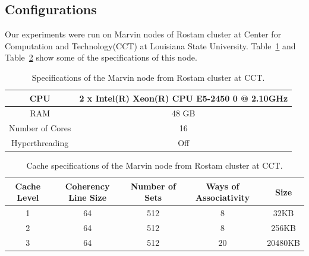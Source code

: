 \subsection{Configurations}
Our experiments were run on Marvin nodes of Rostam cluster at Center for Computation and Technology(CCT) at Louisiana State University. Table~\ref{table3} and Table~\ref{table4} show some of the specifications of this node.

\vspace{\baselineskip}	
\begin{table}[H]
	\centering
	\scalebox{0.75}
	{\begin{tabular}{|c | c |} 
			\hline
			CPU &  2 x Intel(R) Xeon(R) CPU E5-2450 0 @ 2.10GHz \\ [0.5ex] 
			\hline
			RAM & 48 GB\\ 	
			\hline
			Number of Cores & 16\\
			\hline	
			Hyperthreading & Off \\
			\hline			
	\end{tabular}}	
	\caption{Specifications of the Marvin node from Rostam cluster at CCT.}
	\label{table3}
\end{table} 


\vspace{\baselineskip}	
\begin{table}[H]
	\centering
	\scalebox{0.9}
	{\begin{tabular}{|c | c | c | c | c|} 
			\hline
			Cache Level &  Coherency Line Size & Number of Sets & Ways of Associativity & Size\\ [0.5ex] 
			\hline
			1 & 64 & 512 & 8 & 32KB \\	
			\hline
			2 & 64 & 512 & 8 & 256KB \\
			\hline	
			3 & 64 & 512 & 20 & 20480KB \\
			\hline			
	\end{tabular}}	
	\caption{Cache specifications of the Marvin node from Rostam cluster at CCT.}
	\label{table4}
\end{table} 
\vspace{\baselineskip}	

